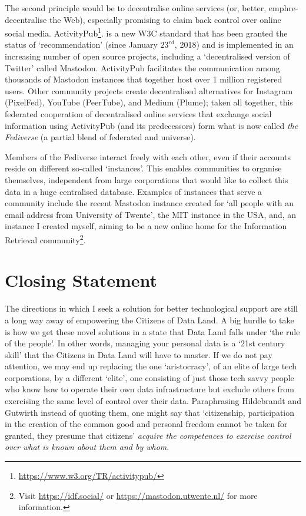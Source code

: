 \documentclass[a4paper,twoside,12pt]{article}
\begin{document}
The second principle would be to decentralise online services (or, better, emph{re-}decentralise the Web), especially promising to claim back control over online social media. ActivityPub\footnote{%
\url{https://www.w3.org/TR/activitypub/}}.
is a new W3C standard that has been granted the status of `recommendation' (since January $23^\textit{rd}$, 2018) and is implemented in an increasing number of open source projects, including a `decentralised version of Twitter' called Mastodon. ActivityPub facilitates the communication among thousands of Mastodon instances that together host over 1 million registered users. Other community projects create decentralised alternatives for Instagram (PixelFed), YouTube (PeerTube), and Medium (Plume); taken all together, this federated cooperation of decentralised online services that exchange social information using ActivityPub (and its predecessors) form what is now called \emph{the Fediverse} (a partial blend of federated and universe). 

Members of the Fediverse interact freely with each other, even if their accounts reside on different so-called `instances'. This enables communities to organise themselves, independent from large corporations that would like to collect this data in a huge centralised database. Examples of instances that serve a community include the recent Mastodon instance created for `all people with an email address from University of Twente', the MIT instance in the USA, and, an instance I created myself, aiming to be a new online home for the Information Retrieval community\footnote{%
Visit \url{https://idf.social/} or \url{https://mastodon.utwente.nl/} for more information.}.

\section*{Closing Statement}

The directions in which I seek a solution for better technological support are still a long way away of empowering the Citizens of Data Land. A big hurdle to take is how we get these novel solutions in a state that Data Land falls under `the rule of the people'. In other words, managing your personal data is a `21st century skill' that the Citizens in Data Land will have to master. If we do not pay attention, we may end up replacing the one `aristocracy', of an elite of large tech corporations, by a different `elite', one consisting of just those tech savvy people who know how to operate their own data infrastructure but exclude others from exercising the same level of control over their data. Paraphrasing Hildebrandt and Gutwirth instead of quoting them, one might say that `citizenship, participation in the creation of the common good and personal freedom cannot be taken for granted, they presume that citizens' \emph{acquire the competences to exercise control over what is known about them and by whom}.



\end{document}
